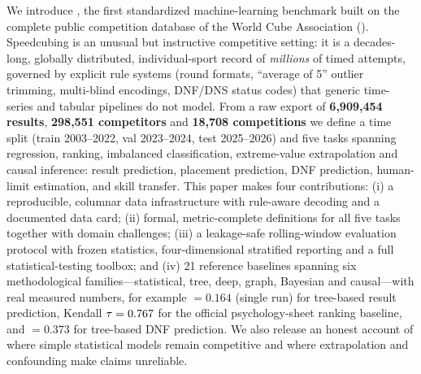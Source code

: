 We introduce \wcabench, the first standardized machine-learning benchmark built
on the complete public competition database of the World Cube Association
(\wca). Speedcubing is an unusual but instructive competitive setting: it is a
decades-long, globally distributed, individual-sport record of \emph{millions}
of timed attempts, governed by explicit rule systems (round formats,
``average of 5'' outlier trimming, multi-blind encodings, DNF/DNS status
codes) that generic time-series and tabular pipelines do not model. From a raw
export of \textbf{6{,}909{,}454 results}, \textbf{298{,}551 competitors} and
\textbf{18{,}708 competitions} we define a time split (train 2003--2022, val
2023--2024, test 2025--2026) and five tasks spanning regression, ranking,
imbalanced classification, extreme-value extrapolation and causal inference:
 result prediction,  placement prediction,  DNF
prediction,  human-limit estimation, and  skill transfer.
This paper makes four contributions: (i) a reproducible, columnar data
infrastructure with rule-aware decoding and a documented data card;
(ii) formal, metric-complete definitions for all five tasks together with
domain challenges; (iii) a leakage-safe rolling-window evaluation protocol
with frozen statistics, four-dimensional stratified reporting and a full
statistical-testing toolbox; and (iv) 21 reference baselines spanning six
methodological families---statistical, tree, deep, graph, Bayesian and
causal---with real measured numbers, for example \maelog{} $=0.164$
(single run) for tree-based result prediction, Kendall $\tau=0.767$ for the
official psychology-sheet ranking baseline, and \aucpr{} $=0.373$ for
tree-based DNF prediction. We also release an honest account of where simple statistical
models remain competitive and where extrapolation and confounding make claims
unreliable.
